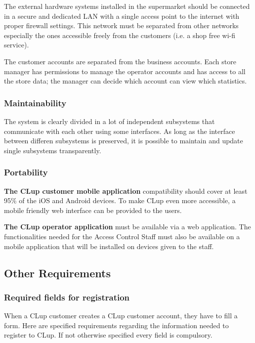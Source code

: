\smallskip

The external hardware systems installed in the supermarket should be connected in a secure and dedicated LAN with a single access point to the internet with proper firewall settings. This network must be separated from other networks especially the ones accessible freely from the customers (i.e. a shop free wi-fi service).

\smallskip

The customer accounts are separated from the business accounts. Each store manager has permissions to manage the operator accounts and has access to all the store data; the manager can decide which account can view which statistics.
\subsubsection{Maintainability}
The system is clearly divided in a lot of independent subsystems that communicate with each other using some interfaces. As long as the interface between differen subsystems is preserved, it is possible to maintain and update single subsystems transparently.
\subsubsection{Portability}
\textbf{The CLup customer mobile application} compatibility should cover at least 95\% of the iOS and Android devices. To make CLup even more accessible, a mobile friendly web interface can be provided to the users.

\smallskip

\textbf{The CLup operator application} must be available via a web application. The functionalities needed for the Access Control Staff must also be available on a mobile application that will be installed on devices given to the staff.
\subsection{Other Requirements}
\subsubsection{Required fields for registration}
When a CLup customer creates a CLup customer account, they have to fill a form. Here are specified requirements regarding the information needed to register to CLup. If not otherwise specified every field is compulsory.

